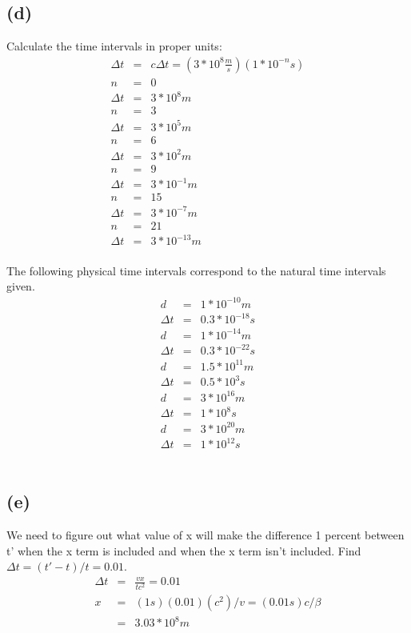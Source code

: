\documentclass[11pt]{amsart}
\begin{document}
\subsection*{(d)} Calculate the time intervals in proper units: \\
\begin{eqnarray*}
\Delta{t} &=& c\Delta{t} = (3*10^{8}\frac{m}{s})(1*10^{-n}s) \\
n &=& 0 \\
\Delta{t} &=& 3*10^{8}m \\
n &=& 3 \\
\Delta{t} &=& 3*10^{5}m \\
n &=& 6 \\
\Delta{t} &=& 3*10^{2}m \\
n &=& 9 \\
\Delta{t} &=& 3*10^{-1}m \\
n &=& 15 \\
\Delta{t} &=& 3*10^{-7}m \\
n &=& 21 \\
\Delta{t} &=& 3*10^{-13}m 
\end{eqnarray*} \\
The following physical time intervals correspond to the natural time intervals given. \\
\begin{eqnarray*} 
d &=& 1*10^{-10}m \\
\Delta{t} &=& 0.3*10^{-18}s \\
d &=& 1*10^{-14}m \\
\Delta{t} &=& 0.3*10^{-22}s \\
d &=& 1.5*10^{11}m \\
\Delta{t} &=& 0.5*10^{3}s \\
d &=& 3*10^{16}m \\
\Delta{t} &=& 1*10^{8}s \\
d &=& 3*10^{20}m \\
\Delta{t} &=& 1*10^{12}s
\end{eqnarray*} \\
\subsection*{(e)} We need to figure out what value of x will make the difference 1 percent between t' when the x term is included and when the x term isn't included. Find $\Delta{t}=(t'-t)/t=0.01$. \\
\begin{eqnarray*}
\Delta{t} &=& \frac{vx}{tc^{2}} = 0.01 \\
x &=& (1s)(0.01)(c^{2})/v = (0.01s)c/\beta \\
&=& 3.03*10^{8}m 
\end{eqnarray*} \\
\end{document}
